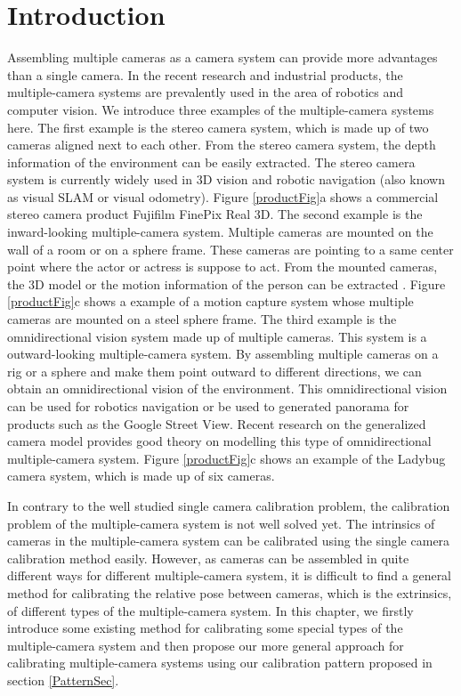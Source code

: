 \documentclass{report}
\begin{document}
\section{Introduction}
Assembling multiple cameras as a camera system can provide more advantages than a single camera. In the recent research and industrial products, the multiple-camera systems are prevalently used in the area of robotics and computer vision. We introduce three examples of the multiple-camera systems here. The first example is the stereo camera system, which is made up of two cameras aligned next to each other. From the stereo camera system, the depth information of the environment can be easily extracted. The stereo camera system is currently widely used in 3D vision and robotic navigation (also known as visual SLAM or visual odometry). Figure \ref{productFig}a shows a commercial stereo camera product Fujifilm FinePix Real 3D. The second example is the inward-looking multiple-camera system. Multiple cameras are mounted on the wall of a room or on a sphere frame. These cameras are pointing to a same center point where the actor or actress is suppose to act. From the mounted cameras, the 3D model or the motion information of the person can be extracted \cite{vlasic2009dynamic}. Figure \ref{productFig}c shows a example of a motion capture system whose multiple cameras are mounted on a steel sphere frame. The third example is the omnidirectional vision system made up of multiple cameras. This system is a outward-looking multiple-camera system. By assembling multiple cameras on a rig or a sphere and make them point outward to different directions, we can obtain an omnidirectional vision of the environment. This omnidirectional vision can be used for robotics navigation or be used to generated panorama for products such as the Google Street View. Recent research on the generalized camera model \cite{pless2003using} provides good theory on modelling this type of omnidirectional multiple-camera system. Figure \ref{productFig}c shows an example of the Ladybug camera system, which is made up of six cameras. 

In contrary to the well studied single camera calibration problem, the calibration problem of the multiple-camera system is not well solved yet. The intrinsics of cameras in the multiple-camera system can be calibrated using the single camera calibration method easily. However, as cameras can be assembled in quite different ways for different multiple-camera system, it is difficult to find a general method for calibrating the relative pose between cameras, which is the extrinsics, of different types of the multiple-camera system. In this chapter, we firstly introduce some existing method for calibrating some special types of the multiple-camera system and then propose our more general approach for calibrating multiple-camera systems using our calibration pattern proposed in section \ref{PatternSec}. 
\end{document}
